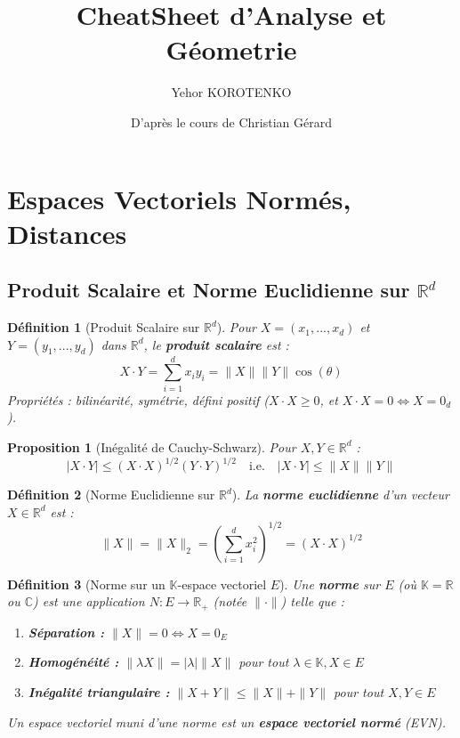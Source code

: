 \documentclass[a4paper]{article}
\title{CheatSheet d'Analyse et Géometrie}
\author{Yehor KOROTENKO}
\date{D'après le cours de Christian Gérard} %
\newcommand{\R}{\mathbb{R}}
\newcommand{\C}{\mathbb{C}} %
\newcommand{\K}{\mathbb{K}} %
\newtheorem{definition}{Définition}[section]
\newtheorem{proposition}{Proposition}[section]
\begin{document}
\maketitle
\tableofcontents %
\newpage

\section{Espaces Vectoriels Normés, Distances}

\subsection{Produit Scalaire et Norme Euclidienne sur \(\R^d\)}
    \begin{definition}[Produit Scalaire sur \(\R^d\)]
        Pour \(X=(x_1, ..., x_d)\) et \(Y=(y_1, ..., y_d)\) dans \(\R^d\), le \textbf{produit scalaire} est :
        \[ X \cdot Y = \sum_{i=1}^d x_i y_i = \|X\| \|Y\| \cos(\theta) \]
        Propriétés : bilinéarité, symétrie, défini positif (\(X \cdot X \ge 0\), et \(X \cdot X = 0 \iff X = 0_d\)).
    \end{definition}
    \begin{proposition}[Inégalité de Cauchy-Schwarz]
        Pour \(X, Y \in \R^d\) :
        \[ |X \cdot Y| \le (X \cdot X)^{1/2} (Y \cdot Y)^{1/2} \quad \text{i.e.} \quad |X \cdot Y| \le \|X\| \|Y\| \]
    \end{proposition}
   \begin{definition}[Norme Euclidienne sur \(\R^d\)]
       La \textbf{norme euclidienne} d'un vecteur \(X \in \R^d\) est :
       \[ \|X\| = \|X\|_2 = \left( \sum_{i=1}^{d} x_i^2 \right)^{1/2} = (X \cdot X)^{1/2} \]
   \end{definition}
   \begin{definition}[Norme sur un \(\K\)-espace vectoriel \(E\)]
       Une \textbf{norme} sur \(E\) (où \(\K = \R\) ou \(\C\)) est une application \(N: E \to \R_+\) (notée \(\|\cdot\|\)) telle que :
       \begin{enumerate}
           \item \textbf{Séparation :} \(\|X\| = 0 \iff X = 0_E\)
           \item \textbf{Homogénéité :} \(\|\lambda X\| = |\lambda| \|X\|\) pour tout \(\lambda \in \K, X \in E\)
           \item \textbf{Inégalité triangulaire :} \(\|X + Y\| \le \|X\| + \|Y\|\) pour tout \(X, Y \in E\)
       \end{enumerate}
       Un espace vectoriel muni d'une norme est un \textbf{espace vectoriel normé} (EVN).
   \end{definition}
\end{document}

